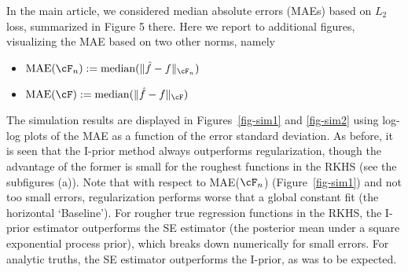 \documentclass[preprint,12pt,authoryear]{elsarticle}
\DeclarePairedDelimiter{\norm}{\lVert}{\rVert}
\begin{document}
In the main article, we considered median absolute errors (MAEs) based on $L_2$ loss, summarized in Figure 5 there. Here we report to additional figures, visualizing the MAE based on two other norms, namely
\begin{itemize}
	\item $\text{MAE}(\cF_n):=\text{median}(\norm{\hat f-f}_{\cF_n})$
	\item $\text{MAE}(\cF):=\text{median}(\norm{\hat f-f}_{\cF})$
\end{itemize}
The simulation results are displayed in Figures~\ref{fig-sim1} and \ref{fig-sim2} using log-log plots of the MAE as a function of the error standard deviation.
As before, it is seen that the I-prior method always outperforms regularization, though the advantage of the former is small for the roughest functions in the RKHS (see the subfigures (a)).
Note that with respect to MAE($\cF_n$) (Figure~\ref{fig-sim1}) and not too small errors, regularization performs worse that a global constant fit (the horizontal `Baseline'). 
For rougher true regression functions in the RKHS, the I-prior estimator outperforms the SE estimator (the posterior mean under a square exponential process prior), which breaks down numerically for small errors. For analytic truths, the SE estimator outperforms the I-prior, as was to be expected. 
\end{document}
